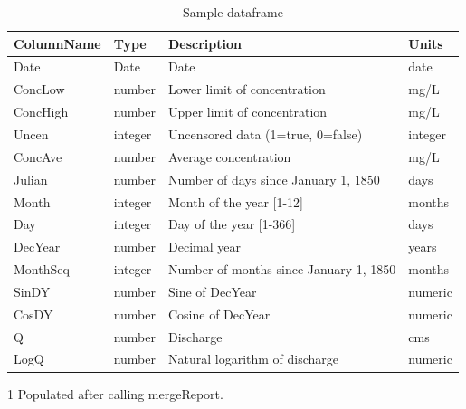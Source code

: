 \documentclass[a4paper,11pt]{article}\usepackage[]{graphicx}\usepackage[]{color}
\begin{document}
\begin{table}[!ht]
  \centering
  \begin{threeparttable}[b]
\caption{Sample dataframe} 
\label{table:Sample1}
\begin{tabular}{llll}
  \hline
ColumnName & Type & Description & Units \\ 
  \hline
Date & Date & Date & date \\ 
  ConcLow & number & Lower limit of concentration & mg/L \\ 
  ConcHigh & number & Upper limit of concentration & mg/L \\ 
  Uncen & integer & Uncensored data (1=true, 0=false) & integer \\ 
  ConcAve & number & Average concentration & mg/L \\ 
  Julian & number & Number of days since January 1, 1850 & days \\ 
  Month & integer & Month of the year [1-12] & months \\ 
  Day & integer & Day of the year [1-366] & days \\ 
  DecYear & number & Decimal year & years \\ 
  MonthSeq & integer & Number of months since January 1, 1850 & months \\ 
  SinDY & number & Sine of DecYear & numeric \\ 
  CosDY & number & Cosine of DecYear & numeric \\ 
  Q \tnote{1} & number & Discharge & cms \\ 
  LogQ \tnote{1} & number & Natural logarithm of discharge & numeric \\ 
   \hline
\end{tabular}
  \begin{tablenotes}
    \item[1] Populated after calling mergeReport.
  \end{tablenotes}
 \end{threeparttable}
\end{table}
\end{document}
